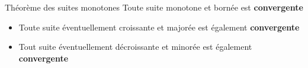 \documentclass[16pt]{report}
\begin{document}
\begin{multicols*}{2}
    \begin{Theorem}{Théorème des suites monotones}{}
        Toute suite monotone et bornée est \textbf{convergente}  
    \end{Theorem}


    \begin{Lemme}{}{}
        \begin{itemize}
            \item Toute suite éventuellement croissante et majorée 
        est également \textbf{convergente}  
            \item Tout suite éventuellement décroissante et 
            minorée est également \textbf{convergente}  
        \end{itemize}
    
    \end{Lemme}
    



\end{multicols*}
\end{document}
